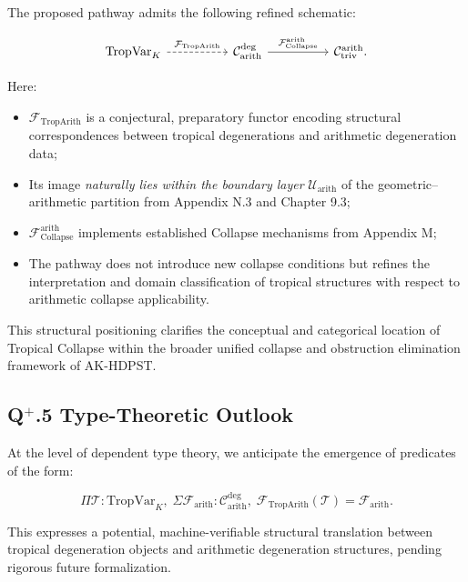 \documentclass[11pt]{article}
\begin{document}
The proposed pathway admits the following refined schematic:

\[
\begin{tikzcd}[column sep=huge, row sep=large]
\mathrm{TropVar}_K \arrow[r, dashed, "\mathcal{F}_{\mathrm{TropArith}}"] 
& \mathcal{C}_{\mathrm{arith}}^{\mathrm{deg}} \arrow[r, "\mathcal{F}_{\mathrm{Collapse}}^{\mathrm{arith}}"]
& \mathcal{C}_{\mathrm{triv}}^{\mathrm{arith}}.
\end{tikzcd}
\]

Here:

\begin{itemize}
    \item \( \mathcal{F}_{\mathrm{TropArith}} \) is a conjectural, preparatory functor encoding structural correspondences between tropical degenerations and arithmetic degeneration data;
    \item Its image \emph{naturally lies within the boundary layer} \( \mathcal{U}_{\mathrm{arith}} \) of the geometric–arithmetic partition from Appendix N.3 and Chapter 9.3;
    \item \( \mathcal{F}_{\mathrm{Collapse}}^{\mathrm{arith}} \) implements established Collapse mechanisms from Appendix M;
    \item The pathway does not introduce new collapse conditions but refines the interpretation and domain classification of tropical structures with respect to arithmetic collapse applicability.
\end{itemize}

This structural positioning clarifies the conceptual and categorical location of Tropical Collapse within the broader unified collapse and obstruction elimination framework of AK-HDPST.


\subsection*{Q$^{+}$.5 Type-Theoretic Outlook}

At the level of dependent type theory, we anticipate the emergence of predicates of the form:

\[
\Pi \mathcal{T} : \mathrm{TropVar}_K,\;
\Sigma \mathcal{F}_{\mathrm{arith}} : \mathcal{C}_{\mathrm{arith}}^{\mathrm{deg}},\;
\mathcal{F}_{\mathrm{TropArith}}(\mathcal{T}) = \mathcal{F}_{\mathrm{arith}}.
\]

This expresses a potential, machine-verifiable structural translation between tropical degeneration objects and arithmetic degeneration structures, pending rigorous future formalization.
\end{document}
